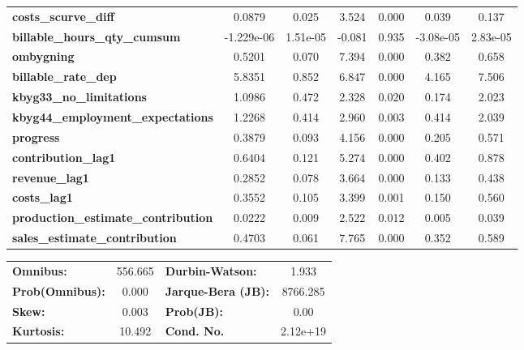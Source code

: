 \begin{center}
\begin{tabular}{lcccccc}
\textbf{costs\_scurve\_diff}                &       0.0879  &        0.025     &     3.524  &         0.000        &        0.039    &        0.137     \\
\textbf{billable\_hours\_qty\_cumsum}       &   -1.229e-06  &     1.51e-05     &    -0.081  &         0.935        &    -3.08e-05    &     2.83e-05     \\
\textbf{ombygning}                          &       0.5201  &        0.070     &     7.394  &         0.000        &        0.382    &        0.658     \\
\textbf{billable\_rate\_dep}                &       5.8351  &        0.852     &     6.847  &         0.000        &        4.165    &        7.506     \\
\textbf{kbyg33\_no\_limitations}            &       1.0986  &        0.472     &     2.328  &         0.020        &        0.174    &        2.023     \\
\textbf{kbyg44\_employment\_expectations}   &       1.2268  &        0.414     &     2.960  &         0.003        &        0.414    &        2.039     \\
\textbf{progress}                           &       0.3879  &        0.093     &     4.156  &         0.000        &        0.205    &        0.571     \\
\textbf{contribution\_lag1}                 &       0.6404  &        0.121     &     5.274  &         0.000        &        0.402    &        0.878     \\
\textbf{revenue\_lag1}                      &       0.2852  &        0.078     &     3.664  &         0.000        &        0.133    &        0.438     \\
\textbf{costs\_lag1}                        &       0.3552  &        0.105     &     3.399  &         0.001        &        0.150    &        0.560     \\
\textbf{production\_estimate\_contribution} &       0.0222  &        0.009     &     2.522  &         0.012        &        0.005    &        0.039     \\
\textbf{sales\_estimate\_contribution}      &       0.4703  &        0.061     &     7.765  &         0.000        &        0.352    &        0.589     \\
\bottomrule
\end{tabular}
\begin{tabular}{lclc}
\textbf{Omnibus:}       & 556.665 & \textbf{  Durbin-Watson:     } &    1.933  \\
\textbf{Prob(Omnibus):} &   0.000 & \textbf{  Jarque-Bera (JB):  } & 8766.285  \\
\textbf{Skew:}          &   0.003 & \textbf{  Prob(JB):          } &     0.00  \\
\textbf{Kurtosis:}      &  10.492 & \textbf{  Cond. No.          } & 2.12e+19  \\
\bottomrule
\end{tabular}
\end{center}

